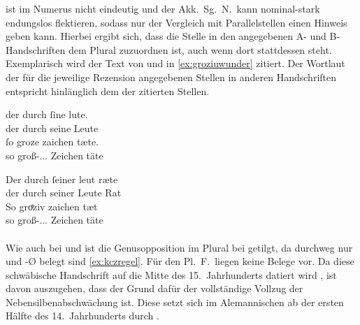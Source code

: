   ist im Numerus nicht eindeutig und der Akk.\ Sg.\
N.\ kann nominal-stark endungslos flektieren, sodass nur der Vergleich mit
Parallelstellen einen Hinweis geben kann. Hierbei ergibt sich, dass die Stelle
in den angegebenen A- und B-Handschriften dem Plural zuzuordnen ist, auch wenn
dort stattdessen \norm{ƶėichen} \wdef{Zeichen} steht. Exemplarisch wird der
Text von \citet{kc:A1} und \citet{kc:B1} in \cref{ex:groziuwunder} zitiert. Der
Wortlaut der für die jeweilige Rezension angegebenen Stellen in anderen
Handschriften entspricht hinlänglich dem der zitierten Stellen.

\begin{exe}
\ex \label{ex:groziuwunder}
	\begin{xlist}
	\ex \label{ex:groziuwunder_1}
		\gll der durch ſine lute. \\
			der durch seine Leute \\
	\sn \gll ſo groze zaichen tæte. \\
			so groß-\Acc.\Pl.\NeutI.\St{} Zeichen täte \\
		\begin{taggedline}{\parencites%
			[\pno~45\rb, 10--11]{kc:A1}[vgl.]%
			[\pno~62\rb, 29--30]{kc:H}%
			[10331--10332]{schroeder1895}%
		}
		\trans {}
		\end{taggedline}

	\ex \label{ex:groziuwunder_2}
		\gll Der durch ſeiner leut ræte \\
			der durch seiner Leute Rat \\
	\sn \gll So groͤziv zaichen tæt \\
			so groß-\Acc.\Pl.\NeutI.\St{} Zeichen täte \\
		\begin{taggedline}{\parencites%
			[\pno~28\vb, 17--18]{kc:B1}[vgl.]%
			[\pno~49\vb, 17--18]{kc:VB}%
			[10331--10332]{schroeder1895}%
		}
		\trans {}
		\end{taggedline}
	\end{xlist}
\end{exe}

\paragraph{\citet{kc:Z}} Wie auch bei \citet{kc:H} und \citet{kc:P} ist die
Genusopposition im Plural bei \citet{kc:Z} getilgt, da durchweg nur 
und -Ø belegt sind \cref{ex:kczregel}. Für den Pl.~F.\ liegen keine Belege vor.
Da diese schwäbische Handschrift auf die Mitte des 15.~Jahrhunderts datiert
wird \autocite[32]{wolf:kckat}, ist davon auszugehen, dass der Grund dafür der
vollständige Vollzug der Nebensilbenabschwächung ist. Diese setzt sich im
Alemannischen ab der ersten Hälfte des 14.~Jahrhunderts durch
\autocites(Schwäbisch wird nicht gesondert ausgewiesen)[vgl.][267,
Abb.~A~69]{ksw2}.

